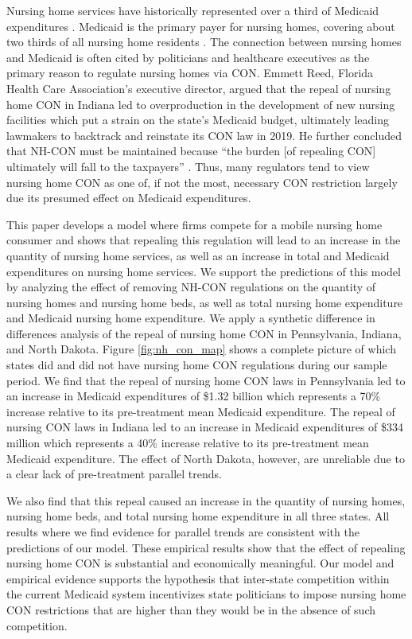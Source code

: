 \documentclass[../Main.tex]{subfiles}
\begin{document}
Nursing home services have historically represented over a third of Medicaid expenditures \citep{wiener1999controlling}. Medicaid is the primary payer for nursing homes, covering about two thirds of all nursing home residents . The connection between nursing homes and Medicaid is often cited by politicians and healthcare executives as the primary reason to regulate nursing homes via CON. Emmett Reed, Florida Health Care Association’s executive director, argued that the repeal of nursing home CON in Indiana led to overproduction in the development of new nursing facilities which put a strain on the state’s Medicaid budget, ultimately leading lawmakers to backtrack and reinstate its CON law in 2019. He further concluded that NH-CON must be maintained because “the burden [of repealing CON] ultimately will fall to the taxpayers” \citep{sexton2019conrepeal}. Thus, many regulators tend to view nursing home CON as one of, if not the most, necessary CON restriction largely due its presumed effect on Medicaid expenditures.

This paper develops a model where firms compete for a mobile nursing home consumer and shows that repealing this regulation will lead to an increase in the quantity of nursing home services, as well as an increase in total and Medicaid expenditures on nursing home services. We support the predictions of this model by analyzing the effect of removing NH-CON regulations on the quantity of nursing homes and nursing home beds, as well as total nursing home expenditure and Medicaid nursing home expenditure. We apply a synthetic difference in differences analysis of the repeal of nursing home CON in Pennsylvania, Indiana, and North Dakota. Figure \ref{fig:nh_con_map} shows a complete picture of which states did and did not have nursing home CON regulations during our sample period. We find that the repeal of nursing home CON laws in Pennsylvania led to an increase in Medicaid expenditures of \$1.32 billion which represents a 70\% increase relative to its pre-treatment mean Medicaid expenditure. The repeal of nursing CON laws in Indiana led to an increase in Medicaid expenditures of \$334 million  which represents a 40\% increase relative to its pre-treatment mean Medicaid expenditure. The effect of North Dakota, however, are unreliable due to a clear lack of pre-treatment parallel trends. 

We also find that this repeal caused an increase in the quantity of nursing homes, nursing home beds, and total nursing home expenditure in all three states. All results where we find evidence for parallel trends are consistent with the predictions of our model. These empirical results show that the effect of repealing nursing home CON is substantial and economically meaningful. Our model and empirical evidence supports the hypothesis that inter-state competition within the current Medicaid system incentivizes state politicians to impose nursing home CON restrictions that are higher than they would be in the absence of such competition.
\end{document}
